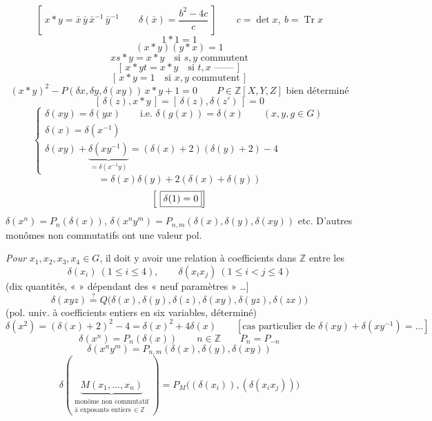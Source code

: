 \documentclass[11pt,a4paper]{article}
\begin{document}
\[
  \left[\ x*y = \bar x\,\bar y\,\bar x^{-1}\,\bar y^{-1} \qquad
  \delta(\bar x) = \frac{b^2-4c}{c} \ \right]
  \qquad c = \det x,\ b = \operatorname{Tr} x
\]
\[
  1*1 = 1
\]
\[
  (x*y)(y*x) = 1
\]
\[
  xs*y = x*y \quad\text{si } s, y \text{ commutent}
\]
\[
  [\, x*yt = x*y \quad\text{si } t, x \text{ ——}\,]
\]
\[
  [\, x*y = 1 \quad\text{si } x, y \text{ commutent}\,]
\]
\[
  (x*y)^2 - P(\delta x,\delta y,\delta(xy))\, x*y + 1 = 0
  \qquad P\in\mathbb{Z}[X,Y,Z] \text{ bien déterminé}
\]
\[
  [\,\delta(z), x*y\,] = [\,\delta(z),\delta(z')\,] = 0
\]
\[
  \left\{
  \begin{array}{l}
    \delta(xy) = \delta(yx) \qquad\text{i.e. } \delta(g(x)) = \delta(x) \qquad (x,y,g\in G) \\
    \delta(x) = \delta(x^{-1}) \\
    \delta(xy) + \underbrace{\delta(xy^{-1})}_{=\delta(x^{-1}y)} = (\delta(x)+2)(\delta(y)+2) - 4
  \end{array}
  \right.
\]
\[
  = \delta(x)\delta(y) + 2(\delta(x)+\delta(y))
\]
\[
  \Bigl[\ \boxed{\delta(1) = 0} \Bigr]
\]
$\delta(x^n) = P_n(\delta(x))$, $\delta(x^n y^m) = P_{n,m}(\delta(x),\delta(y),\delta(xy))$ etc.  D'autres monômes non commutatifs ont une valeur pol.

\emph{Pour} $x_1, x_2, x_3, x_4\in G$, il doit y avoir une relation à coefficients dans $\mathbb{Z}$ entre les
\[
  \delta(x_i)\ (1\leq i\leq 4), \qquad \delta(x_i x_j)\ (1\leq i<j\leq 4)
\]
(dix quantités,  «  » dépendant des « neuf paramètres » …]
\[
  \boxed{\ \delta(xyz) \overset{?}{=} Q\bigl(\delta(x),\delta(y),\delta(z),\delta(xy),\delta(yz),\delta(zx)\bigr)\ }
\]
(pol. univ. à coefficients entiers en six variables, déterminé)
\[
  \delta(x^2) = (\delta(x)+2)^2 - 4 = \delta(x)^2 + 4\delta(x)
  \qquad [\text{cas particulier de } \delta(xy)+\delta(xy^{-1}) = \ldots]
\]
\[
  \delta(x^n) = P_n(\delta(x)) \qquad n\in\mathbb{Z} \qquad P_n = P_{-n}
\]
\[
  \delta(x^n y^m) = P_{n,m}(\delta(x),\delta(y),\delta(xy))
\]
\[
  \delta(\underbrace{M(x_1,\ldots,x_n)}_{\substack{\text{monôme non commutatif}\\ \text{à exposants entiers}\,\in\mathbb{Z}}})
  = P_M\bigl((\delta(x_i)),(\delta(x_i x_j))\bigr)
\]
\end{document}
